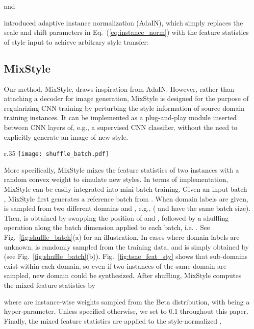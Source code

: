 \documentclass{article} \usepackage{iclr2021_conference,times}
\begin{document}
and


\citet{huang2017arbitrary} introduced adaptive instance normalization (AdaIN), which simply replaces the scale and shift parameters in Eq.~(\ref{eq:instance_norm}) with the feature statistics of style input  to achieve arbitrary style transfer:



\subsection{MixStyle} \label{sec:method:mixstyle}
Our method, MixStyle, draws inspiration from AdaIN. However, rather than attaching a decoder for image generation, MixStyle is designed for the purpose of regularizing CNN training by perturbing the style information of source domain training instances. It can be implemented as a plug-and-play module inserted between CNN layers of, e.g., a supervised CNN classifier, without the need to explicitly generate an image of new style.

\begin{wrapfigure}{r}{.35\textwidth}
\vspace{-.3cm}
\centering
\texttt{[image: shuffle\_batch.pdf]}
\caption{A graphical illustration of how a reference batch is generated. Domain label is denoted by color.}
\label{fig:shuffle_batch}
\vspace{-.3cm}
\end{wrapfigure}

More specifically, MixStyle mixes the feature statistics of two instances with a random convex weight to simulate new styles. In terms of implementation, MixStyle can be easily integrated into mini-batch training. Given an input batch , MixStyle first generates a reference batch  from . When domain labels are given,  is sampled from two different domains  and , e.g.,  ( and  have the same batch size). Then,  is obtained by swapping the position of  and , followed by a shuffling operation along the batch dimension applied to each batch, i.e. . See Fig.~\ref{fig:shuffle_batch}(a) for an illustration. In cases where domain labels are unknown,  is randomly sampled from the training data, and  is simply obtained by  (see Fig.~\ref{fig:shuffle_batch}(b)). Fig.~\ref{fig:tsne_feat_sty} shows that sub-domains exist within each domain, so even if two instances of the same domain are sampled, new domain could be synthesized. After shuffling, MixStyle computes the mixed feature statistics by

where  are instance-wise weights sampled from the Beta distribution,  with  being a hyper-parameter. Unless specified otherwise, we set  to 0.1 throughout this paper. Finally, the mixed feature statistics are applied to the style-normalized ,
\end{document}

